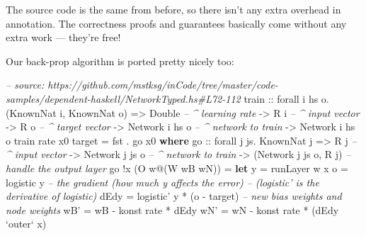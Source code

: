 \documentclass[]{article}
\newenvironment{Shaded}{}{}
\newcommand{\KeywordTok}[1]{\textcolor[rgb]{0.00,0.44,0.13}{\textbf{{#1}}}}
\newcommand{\DataTypeTok}[1]{\textcolor[rgb]{0.56,0.13,0.00}{{#1}}}
\newcommand{\CommentTok}[1]{\textcolor[rgb]{0.38,0.63,0.69}{\textit{{#1}}}}
\newcommand{\OtherTok}[1]{\textcolor[rgb]{0.00,0.44,0.13}{{#1}}}
\newcommand{\FunctionTok}[1]{\textcolor[rgb]{0.02,0.16,0.49}{{#1}}}
\newcommand{\NormalTok}[1]{{#1}}
\begin{document}
The source code is the same from before, so there isn't any extra
overhead in annotation. The correctness proofs and guarantees basically
come without any extra work --- they're free!

Our back-prop algorithm is ported pretty nicely too:

\begin{Shaded}
\begin{Highlighting}[]
\CommentTok{-- source: https://github.com/mstksg/inCode/tree/master/code-samples/dependent-haskell/NetworkTyped.hs#L72-112}
\OtherTok{train ::} \NormalTok{forall i hs o}\FunctionTok{.} \NormalTok{(}\DataTypeTok{KnownNat} \NormalTok{i, }\DataTypeTok{KnownNat} \NormalTok{o)}
      \OtherTok{=>} \DataTypeTok{Double}           \CommentTok{-- ^ learning rate}
      \OtherTok{->} \DataTypeTok{R} \NormalTok{i              }\CommentTok{-- ^ input vector}
      \OtherTok{->} \DataTypeTok{R} \NormalTok{o              }\CommentTok{-- ^ target vector}
      \OtherTok{->} \DataTypeTok{Network} \NormalTok{i hs o   }\CommentTok{-- ^ network to train}
      \OtherTok{->} \DataTypeTok{Network} \NormalTok{i hs o}
\NormalTok{train rate x0 target }\FunctionTok{=} \NormalTok{fst }\FunctionTok{.} \NormalTok{go x0}
  \KeywordTok{where}
\OtherTok{    go  ::} \NormalTok{forall j js}\FunctionTok{.} \DataTypeTok{KnownNat} \NormalTok{j}
        \OtherTok{=>} \DataTypeTok{R} \NormalTok{j              }\CommentTok{-- ^ input vector}
        \OtherTok{->} \DataTypeTok{Network} \NormalTok{j js o   }\CommentTok{-- ^ network to train}
        \OtherTok{->} \NormalTok{(}\DataTypeTok{Network} \NormalTok{j js o, }\DataTypeTok{R} \NormalTok{j)}
    \CommentTok{-- handle the output layer}
    \NormalTok{go }\FunctionTok{!}\NormalTok{x (}\DataTypeTok{O} \NormalTok{w}\FunctionTok{@}\NormalTok{(}\DataTypeTok{W} \NormalTok{wB wN))}
        \FunctionTok{=} \KeywordTok{let} \NormalTok{y    }\FunctionTok{=} \NormalTok{runLayer w x}
              \NormalTok{o    }\FunctionTok{=} \NormalTok{logistic y}
              \CommentTok{-- the gradient (how much y affects the error)}
              \CommentTok{--   (logistic' is the derivative of logistic)}
              \NormalTok{dEdy }\FunctionTok{=} \NormalTok{logistic' y }\FunctionTok{*} \NormalTok{(o }\FunctionTok{-} \NormalTok{target)}
              \CommentTok{-- new bias weights and node weights}
              \NormalTok{wB'  }\FunctionTok{=} \NormalTok{wB }\FunctionTok{-} \NormalTok{konst rate }\FunctionTok{*} \NormalTok{dEdy}
              \NormalTok{wN'  }\FunctionTok{=} \NormalTok{wN }\FunctionTok{-} \NormalTok{konst rate }\FunctionTok{*} \NormalTok{(dEdy }\OtherTok{`outer`} \NormalTok{x)}

\end{Highlighting}
\end{Shaded}
\end{document}
